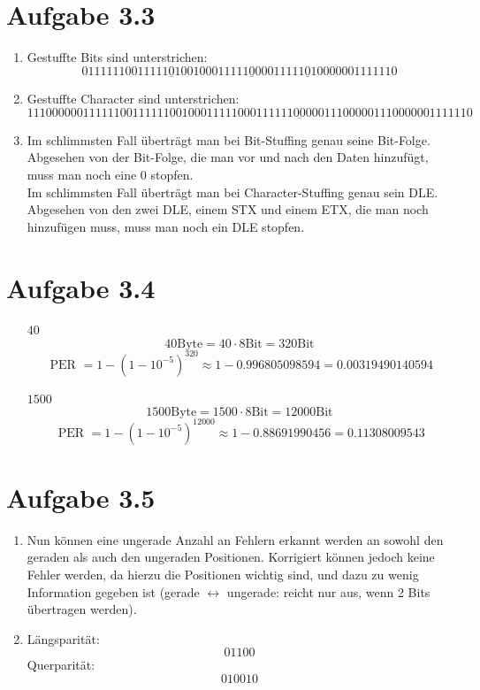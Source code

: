 \documentclass[12pt, a4paper]{article}
\begin{document}
\section*{Aufgabe 3.3}
\begin{enumerate}[label=\alph*)]
	\item	Gestuffte Bits sind unterstrichen:
			$$01111110 011111\underline{0}10 01000111 11\underline{0}000111 11\underline{0}100000 01111110$$
	
	\item	Gestuffte Character sind unterstrichen:
			$$11100000 01111110 01111110 01000111 11000111 \underline{11100000} 11100000 11100000 01111110$$
	
	\item	Im schlimmsten Fall überträgt man bei Bit-Stuffing genau seine Bit-Folge. Abgesehen von der Bit-Folge, die man vor und nach den Daten hinzufügt, muss man noch eine 0 stopfen.\\
			Im schlimmsten Fall überträgt man bei Character-Stuffing genau sein DLE. Abgesehen von den zwei DLE, einem STX und einem ETX, die man noch hinzufügen muss, muss man noch ein DLE stopfen.
\end{enumerate}

\newpage

\section*{Aufgabe 3.4}
\begin{itemize}
	\item[$40$]		$$40 \text{Byte} = 40 \cdot 8 \text{Bit} = 320 \text{Bit}$$
					$$\text{ PER } = 1 - (1-10^{-5})^{320} \approx 1 - 0.996805098594 = 0.00319490140594$$
	
	\item[$1500$]	$$1500 \text{Byte} = 1500 \cdot 8 \text{Bit} = 12000 \text{Bit}$$
					$$\text{ PER } = 1 - (1-10^{-5})^{12000} \approx 1 - 0.88691990456 = 0.11308009543$$
\end{itemize}



\section*{Aufgabe 3.5}
\begin{enumerate}[label=\alph*)]
	\item	Nun können eine ungerade Anzahl an Fehlern erkannt werden an sowohl den geraden als auch den ungeraden Positionen. Korrigiert können jedoch keine Fehler werden, da hierzu die Positionen wichtig sind, und dazu zu wenig Information gegeben ist (gerade $\leftrightarrow$ ungerade: reicht nur aus, wenn 2 Bits übertragen werden).
	
	\item	Längsparität:
			$$01100$$
			Querparität:
			$$010010$$
\end{enumerate}
\end{document}
